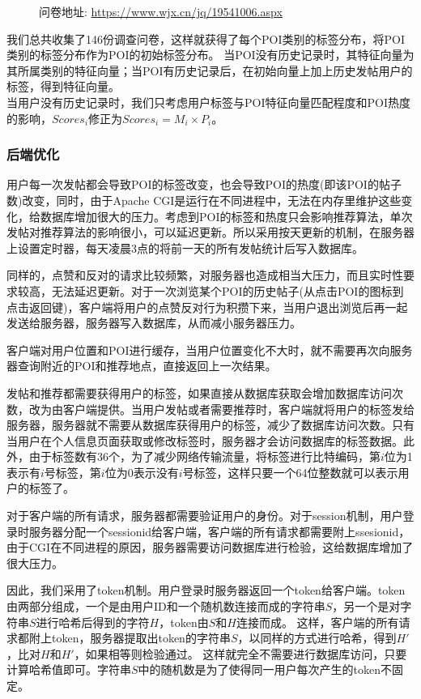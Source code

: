 \documentclass[UTF8]{article}
\begin{document}
\begin{figure}[H]
\begin{minipage}[t]{0.4\textwidth}
\end{minipage}
\caption*{问卷地址: \url{https://www.wjx.cn/jq/19541006.aspx}}
\end{figure}
我们总共收集了146份调查问卷，这样就获得了每个POI类别的标签分布，将POI类别的标签分布作为POI的初始标签分布。
当POI没有历史记录时，其特征向量为其所属类别的特征向量；当POI有历史记录后，在初始向量上加上历史发帖用户的标签，得到特征向量。\\
当用户没有历史记录时，我们只考虑用户标签与POI特征向量匹配程度和POI热度的影响，$Scores_i$修正为$Scores_i=M_i \times P_i$。

\subsubsection{后端优化}
用户每一次发帖都会导致POI的标签改变，也会导致POI的热度(即该POI的帖子数)改变，同时，由于Apache CGI是运行在不同进程中，无法在内存里维护这些变化，给数据库增加很大的压力。考虑到POI的标签和热度只会影响推荐算法，单次发帖对推荐算法的影响很小，可以延迟更新。所以采用按天更新的机制，在服务器上设置定时器，每天凌晨3点的将前一天的所有发帖统计后写入数据库。

同样的，点赞和反对的请求比较频繁，对服务器也造成相当大压力，而且实时性要求较高，无法延迟更新。对于一次浏览某个POI的历史帖子(从点击POI的图标到点击返回键)，客户端将用户的点赞反对行为积攒下来，当用户退出浏览后再一起发送给服务器，服务器写入数据库，从而减小服务器压力。

客户端对用户位置和POI进行缓存，当用户位置变化不大时，就不需要再次向服务器查询附近的POI和推荐地点，直接返回上一次结果。

发帖和推荐都需要获得用户的标签，如果直接从数据库获取会增加数据库访问次数，改为由客户端提供。当用户发帖或者需要推荐时，客户端就将用户的标签发给服务器，服务器就不需要从数据库获得用户的标签，减少了数据库访问次数。只有当用户在个人信息页面获取或修改标签时，服务器才会访问数据库的标签数据。此外，由于标签数有36个，为了减少网络传输流量，将标签进行比特编码，第$i$位为1表示有$i$号标签，第$i$位为0表示没有$i$号标签，这样只要一个64位整数就可以表示用户的标签了。

对于客户端的所有请求，服务器都需要验证用户的身份。对于session机制，用户登录时服务器分配一个sessionid给客户端，客户端的所有请求都需要附上ssesionid，由于CGI在不同进程的原因，服务器需要访问数据库进行检验，这给数据库增加了很大压力。

因此，我们采用了token机制。用户登录时服务器返回一个token给客户端。token由两部分组成，一个是由用户ID和一个随机数连接而成的字符串$S$，另一个是对字符串$S$进行哈希后得到的字符$H$，token由$S$和$H$连接而成。
这样，客户端的所有请求都附上token，服务器提取出token的字符串$S$，以同样的方式进行哈希，得到$H'$，比对$H$和$H'$，如果相等则检验通过。
这样就完全不需要进行数据库访问，只要计算哈希值即可。字符串$S$中的随机数是为了使得同一用户每次产生的token不固定。
\end{document}
